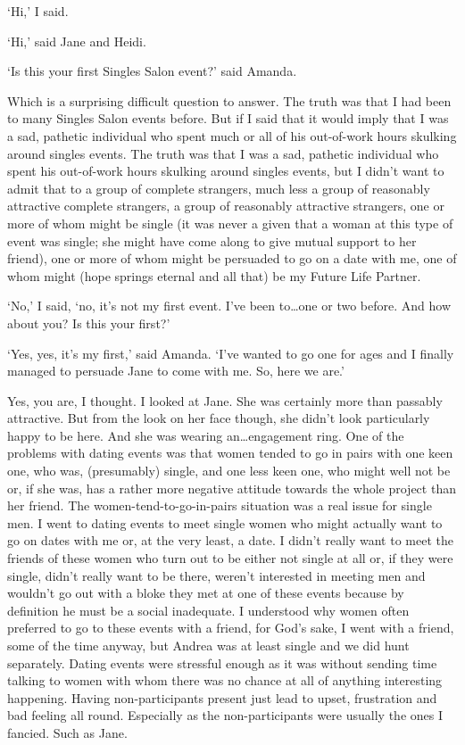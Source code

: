 `Hi,' I said.

`Hi,' said Jane and Heidi.

`Is this your first Singles Salon event?' said Amanda.

Which is a surprising difficult question to answer. The truth was
that I had been to many Singles Salon events before. But if I said
that it would imply that I was a sad, pathetic individual who spent
much or all of his out-of-work hours skulking around singles events.
The truth was that I {\twelveit was\/} a sad, pathetic individual
who spent his out-of-work hours skulking around singles events, but
I didn't want to admit that to a group of complete strangers, much
less a group of reasonably attractive complete strangers, a group of
reasonably attractive strangers, one or more of whom might be single
(it was never a given that a woman at this type of event was single;
she might have come along to give mutual support to her friend), one
or more of whom might be persuaded to go on a date with me, one of
whom might (hope springs eternal and all that) be my Future Life
Partner.

`No,' I said, `no, it's not my first event. I've been to\dots one or
two before. And how about you? Is this your first?'

`Yes, yes, it's my first,' said Amanda. `I've wanted to go one for
ages and I finally managed to persuade Jane to come with me. So,
here we are.'

Yes, you are, I thought. I looked at Jane. She was certainly more
than passably attractive. But from the look on her face though, she
didn't look particularly happy to be here. And she was wearing
an\dots engagement ring. One of the problems with dating events was
that women tended to go in pairs with one keen one, who was,
(presumably) single, and one less keen one, who might well not be
or, if she was, has a rather more negative attitude towards the
whole project than her friend. The women-tend-to-go-in-pairs
situation was a real issue for single men. I went to dating events
to meet single women who might actually want to go on dates with me
or, at the very least, {\twelveit a\/} date. I didn't really want to
meet the friends of these women who turn out to be either not single
at all or, if they were single, didn't really want to be there,
weren't interested in meeting men and wouldn't go out with a bloke
they met at one of these events because by definition he must be a
social inadequate. I understood why women often preferred to go to
these events with a friend, for God's sake, {\twelveit I\/} went
with a friend, some of the time anyway, but Andrea was at least
single and we did hunt separately. Dating events were stressful
enough as it was without sending time talking to women with whom
there was no chance {\twelveit at all\/} of anything interesting
happening. Having non-participants present just lead to upset,
frustration and bad feeling all round. Especially as the
non-participants were usually the ones I fancied. Such as Jane.

